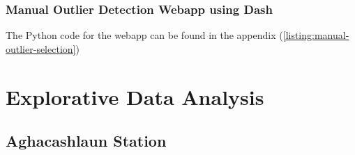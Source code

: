 
\subsubsection{Manual Outlier Detection Webapp using Dash}
The Python code for the webapp can be found in the appendix (\autoref{listing:manual-outlier-selection})

\section{Explorative Data Analysis}
\subsection{Aghacashlaun Station}


